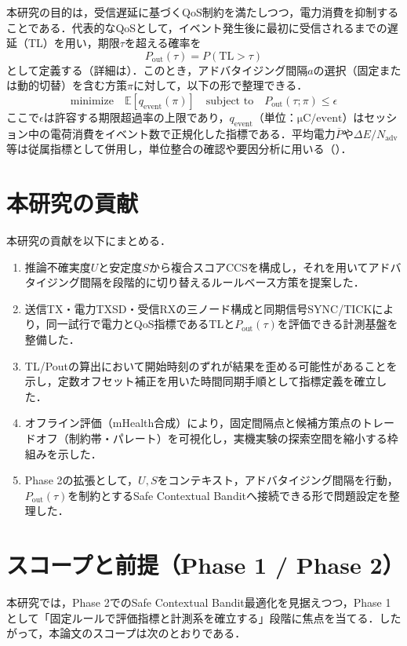 本研究の目的は，受信遅延に基づくQoS制約を満たしつつ，電力消費を抑制することである．代表的なQoSとして，イベント発生後に最初に受信されるまでの遅延（TL）を用い，期限$\tau$を超える確率を
\begin{equation}
  P_{\mathrm{out}}(\tau)=P(\mathrm{TL}>\tau)
\end{equation}
として定義する（詳細は）．このとき，アドバタイジング間隔$a$の選択（固定または動的切替）を含む方策$\pi$に対して，以下の形で整理できる．
\begin{equation}
  \text{minimize}\quad \mathbb{E}[q_{\mathrm{event}}(\pi)]
  \quad \text{subject to}\quad P_{\mathrm{out}}(\tau;\pi)\le \epsilon
\end{equation}
ここで$\epsilon$は許容する期限超過率の上限であり，$q_{\mathrm{event}}$（単位：$\si{\micro\coulomb}/\text{event}$）はセッション中の電荷消費をイベント数で正規化した指標である．平均電力$\overline{P}$や$\Delta E/N_{\mathrm{adv}}$等は従属指標として併用し，単位整合の確認や要因分析に用いる（）．

\section{本研究の貢献}
本研究の貢献を以下にまとめる．
\begin{enumerate}
  \item 推論不確実度$U$と安定度$S$から複合スコアCCSを構成し，それを用いてアドバタイジング間隔を段階的に切り替えるルールベース方策を提案した．
\item 送信TX・電力TXSD・受信RXの三ノード構成と同期信号SYNC/TICKにより，同一試行で電力とQoS指標であるTLと$P_{\mathrm{out}}(\tau)$を評価できる計測基盤を整備した．
  \item TL/Poutの算出において開始時刻のずれが結果を歪める可能性があることを示し，定数オフセット補正を用いた時間同期手順として指標定義を確立した．
  \item オフライン評価（mHealth合成）により，固定間隔点と候補方策点のトレードオフ（制約帯・パレート）を可視化し，実機実験の探索空間を縮小する枠組みを示した．
  \item Phase 2の拡張として，$U,S$をコンテキスト，アドバタイジング間隔を行動，$P_{\mathrm{out}}(\tau)$を制約とするSafe Contextual Banditへ接続できる形で問題設定を整理した．
\end{enumerate}

\section{スコープと前提（Phase 1 / Phase 2）}
本研究では，Phase 2でのSafe Contextual Bandit最適化を見据えつつ，Phase 1として「固定ルールで評価指標と計測系を確立する」段階に焦点を当てる．したがって，本論文のスコープは次のとおりである．

